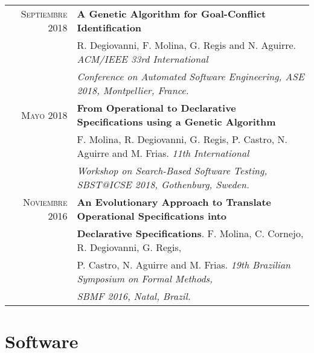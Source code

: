 \documentclass[a4paper,10pt]{article} %
\begin{document}
\begin{longtable}{rl}
\textsc{Septiembre} 2018  & \textbf{A Genetic Algorithm for Goal-Conflict Identification} \\
& R. Degiovanni, F. Molina, G. Regis and N. Aguirre. \textit{{ACM/IEEE} 33rd International} \\
& \textit{Conference on Automated Software Engineering, ASE 2018, Montpellier, France.} \\

\textsc{Mayo} 2018 & \textbf{From Operational to Declarative Specifications using a Genetic Algorithm} \\ 
& F. Molina, R. Degiovanni, G. Regis, P. Castro, N. Aguirre and M. Frias. \textit{11th International}\\
& \textit{Workshop on Search-Based Software Testing, SBST@ICSE 2018, Gothenburg, Sweden.} \\

\textsc{Noviembre} 2016 & \textbf{An Evolutionary Approach to Translate Operational Specifications into} \\ 
& \textbf{Declarative Specifications}. F. Molina, C. Cornejo, R. Degiovanni, G. Regis, \\ 
& P. Castro, N. Aguirre and M. Frias. \textit{19th Brazilian Symposium on Formal Methods,} \\ 
& \textit{SBMF 2016, Natal, Brazil.} \\

\end{longtable}




\section{Software}
\end{document}
